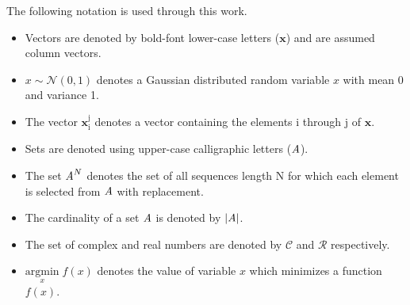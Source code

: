%
The following notation is used through this work. \par
\begin{itemize}
\item 
Vectors are denoted by bold-font lower-case letters ($\mathbf{x}$) and are assumed column vectors.
\item 
$x \sim \mathcal{N}(0,1)$ denotes a Gaussian distributed random variable $x$ with mean 0 and variance 1.
\item 
The vector $\mathbf{x}_{\mathrm{i}}^{\mathrm{j}}$ denotes a vector containing the elements i through j of $\mathbf{x}$.
\item Sets are denoted using upper-case calligraphic letters ($\textit{\cal{A}}$).
\item The set $\textit{\cal{A}}^N$ denotes the set of all sequences length N for which each element is selected from $\textit{\cal{A}}$ with replacement.
\item The cardinality of a set $\textit{\cal{A}}$ is denoted by $|\textit{\cal{A}}|$.
\item The set of complex and real numbers are denoted by $\mathcal{C}$ and $\mathcal{R}$ respectively.
\item $\underset{x}{\text{argmin}} \; f(x)$ denotes the value of variable $x$ which minimizes a function $f(x)$.
\end{itemize}

\clearpage
